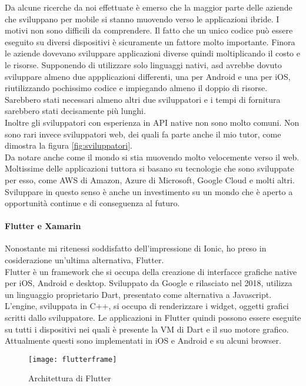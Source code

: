 Da alcune ricerche da noi effettuate è emerso che la maggior parte delle aziende che sviluppano per mobile si stanno muovendo verso le
applicazioni ibride. I motivi non sono difficili da comprendere. Il fatto che un unico codice può essere eseguito su diversi dispositivi è
sicuramente un fattore molto importante. Finora le aziende dovevano sviluppare applicazioni diverse quindi moltiplicando il costo e le
risorse. Supponendo di utilizzare solo linguaggi nativi, \acrlong{asd} avrebbe dovuto sviluppare almeno due appplicazioni differenti, una
per Android e una per iOS, riutilizzando pochissimo codice e impiegando almeno il doppio di risorse. Sarebbero stati necessari almeno altri
due sviluppatori e i tempi di fornitura sarebbero stati decisamente più lunghi. \\
Inoltre gli sviluppatori con esperienza in API native non sono molto comuni. Non sono rari invece sviluppatori web, dei quali fa parte anche il mio
tutor, come dimostra la figura \autoref{fig:sviluppatori}. \\
Da notare anche come il mondo si stia muovendo molto velocemente verso il web. Moltissime delle applicazioni tuttora si basano su tecnologie
che sono sviluppate per esso, come AWS di Amazon, Azure di Microsoft, Google Cloud e molti altri. Sviluppare in questo senso è
anche un investimento su un mondo che è aperto a opportunità continue e di conseguenza al futuro.

\paragraph{Flutter e Xamarin}
Nonostante mi ritenessi soddisfatto dell'impressione di Ionic, ho preso in cosiderazione un'ultima alternativa, Flutter. \\
Flutter è un framework che si occupa della creazione di interfacce grafiche native per iOS, Android e desktop. Sviluppato da Google e
rilasciato nel 2018, utilizza un linguaggio proprietario Dart, presentato come alternativa a Javascript. L'engine, sviluppata in
\gls{C++}, si occupa di renderizzare i widget, oggetti grafici scritti dallo sviluppatore. Le applicazioni in Flutter quindi possono essere
eseguite su tutti i dispositivi nei quali è presente la VM di Dart e il suo motore grafico. Attualmente questi sono implementati in iOS e
Android e su alcuni browser. \\

\begin{figure}[h]
  \texttt{[image: flutterframe]} 
  \caption{Architettura di Flutter}
  \label{fig:flutter}
\end{figure}

